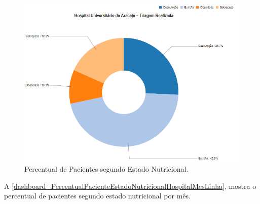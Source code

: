 \begin{figure}[htb]
	\caption{\label{dashboard_PercentualPacienteEstadoNutricionalHospitalAnoPizza}Percentual de Pacientes segundo Estado Nutricional.}
	\begin{center}
	    \includegraphics[scale=0.9]{Imagens/3.1.PercentualPacienteEstadoNutricionalHospitalAnoPizza.png}
	\end{center}
\end{figure}

\newpage
A \autoref{dashboard_PercentualPacienteEstadoNutricionalHospitalMesLinha}, mostra o percentual de pacientes segundo estado nutricional por mês.

